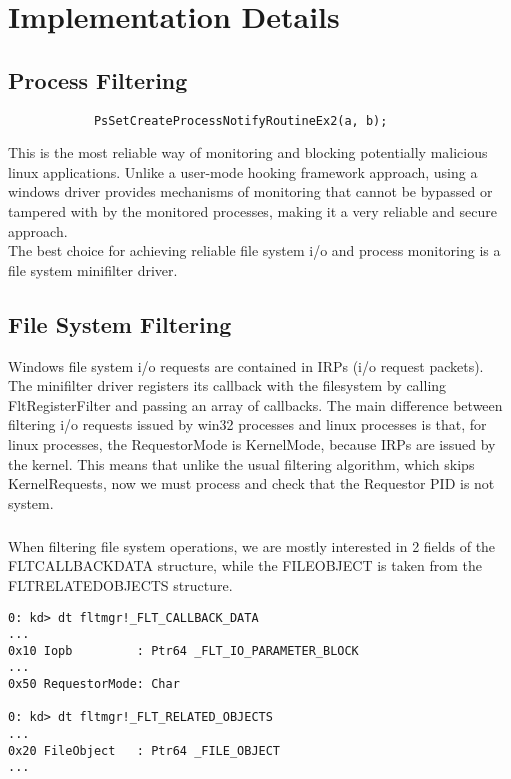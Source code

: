 \chapter{Implementation Details}
    \section{Process Filtering}
        \begin{lstlisting}
            PsSetCreateProcessNotifyRoutineEx2(a, b);
        \end{lstlisting}
            
    This is the most reliable way of monitoring and blocking potentially malicious linux applications. Unlike a user-mode hooking framework
    approach, using a windows driver provides mechanisms of monitoring that cannot be bypassed or tampered with by the monitored processes, making
    it a very reliable and secure approach.\\
    The best choice for achieving reliable file system i/o and process monitoring is a file system minifilter driver.
    
    \section{File System Filtering}
    Windows file system i/o requests are contained in IRPs (i/o request packets). The minifilter driver registers its callback with the
    filesystem by calling FltRegisterFilter and passing an array of callbacks. The main difference between filtering i/o requests issued by win32
    processes and linux processes is that, for linux processes, the RequestorMode is KernelMode, because IRPs are issued by the kernel. This means
    that unlike the usual filtering algorithm, which skips KernelRequests, now we must process and check that the Requestor PID is not system.

    \paragraph{}
    When filtering file system operations, we are mostly interested in 2 fields of the FLT\textunderscore CALLBACK\textunderscore DATA structure,
    while the FILE\textunderscore OBJECT is taken from the FLT\textunderscore RELATED\textunderscore OBJECTS structure.

    \begin{verbatim}
0: kd> dt fltmgr!_FLT_CALLBACK_DATA
...
0x10 Iopb         : Ptr64 _FLT_IO_PARAMETER_BLOCK
...
0x50 RequestorMode: Char

0: kd> dt fltmgr!_FLT_RELATED_OBJECTS
...
0x20 FileObject   : Ptr64 _FILE_OBJECT
...
    \end{verbatim}

